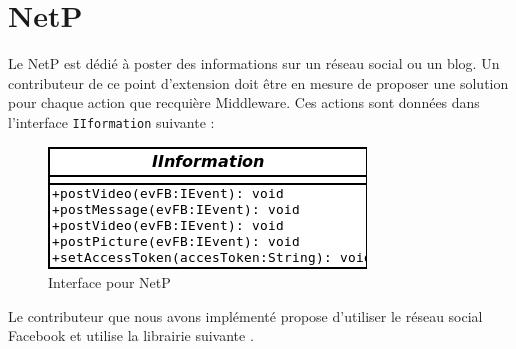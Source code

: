 \section{NetP}
Le  NetP est dédié à poster des informations sur un  réseau social ou un blog. Un contributeur de ce point d'extension doit être en mesure de proposer une solution pour chaque action que recquière Middleware. Ces actions sont données dans l'interface \verb+IIformation+ suivante :
\begin{figure}[htbp]
  \centering
  \includegraphics[scale=0.50]{img/iinterface}
  \caption{Interface pour NetP}
  \label{fig:IInterface}
\end{figure}

Le contributeur que nous avons implémenté propose d'utiliser le réseau social Facebook et utilise la librairie suivante \cite{restFB}.





